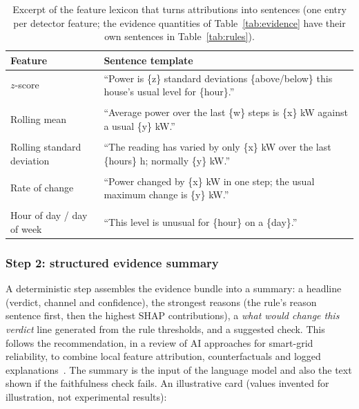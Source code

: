 \documentclass[11pt,a4paper]{article}
\begin{document}
\begin{table}[H]
\centering
\small
\begin{tabularx}{\textwidth}{@{}>{\raggedright\arraybackslash}p{3.2cm}L@{}}
\toprule
\textbf{Feature} & \textbf{Sentence template} \\
\midrule
$z$-score & ``Power is \{z\} standard deviations \{above/below\} this house's usual level for \{hour\}.'' \\ \\
Rolling mean & ``Average power over the last \{w\} steps is \{x\} kW against a usual \{y\} kW.'' \\ \\
Rolling standard deviation & ``The reading has varied by only \{x\} kW over the last \{hours\} h; normally \{y\} kW.'' \\ \\
Rate of change & ``Power changed by \{x\} kW in one step; the usual maximum change is \{y\} kW.'' \\ \\
Hour of day / day of week & ``This level is unusual for \{hour\} on a \{day\}.'' \\
\bottomrule
\end{tabularx}
\caption{Excerpt of the feature lexicon that turns attributions into sentences (one entry per detector
feature; the evidence quantities of Table~\ref{tab:evidence} have their own sentences in Table~\ref{tab:rules}).}
\label{tab:lexicon}
\end{table}

\subsubsection*{Step 2: structured evidence summary}
A deterministic step assembles the evidence bundle into a summary: a headline (verdict, channel and
confidence), the strongest reasons (the rule's reason sentence first, then the highest SHAP contributions),
a \emph{what would change this verdict} line generated from the rule thresholds, and a suggested check. This
follows the recommendation, in a review of AI approaches for smart-grid reliability, to combine local feature
attribution, counterfactuals and logged explanations~\cite{review2025}. The summary is the input of the
language model and also the text shown if the faithfulness check fails. An illustrative card (values invented
for illustration, not experimental results):
\end{document}
